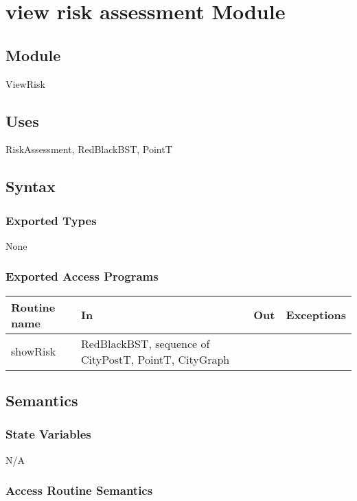 \documentclass[12pt]{article}
\begin{document}
\newpage

\section* {view risk assessment Module}

\subsection* {Module}

ViewRisk

\subsection* {Uses}

RiskAssessment, RedBlackBST, PointT

\subsection* {Syntax}

\subsubsection* {Exported Types}

None

\subsubsection* {Exported Access Programs}

\begin{tabular}{| l | l | l | p{6cm} |}
\hline
\textbf{Routine name} & \textbf{In} & \textbf{Out} & \textbf{Exceptions}\\
\hline
showRisk & RedBlackBST, sequence of CityPostT, PointT, CityGraph &  &  ~\\
\hline
\end{tabular}

\subsection* {Semantics}

\subsubsection* {State Variables}

N/A


\subsubsection* {Access Routine Semantics}
\end{document}
